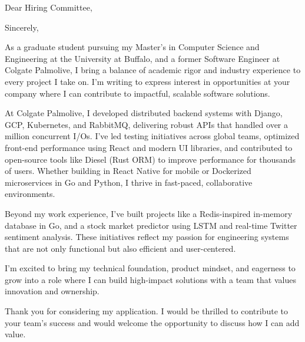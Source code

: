 \documentclass[11pt,a4paper,roman]{moderncv}
\begin{document}
\date{\today}
\opening{Dear Hiring Committee,}
\closing{Sincerely,}
\makelettertitle

As a graduate student pursuing my Master’s in Computer Science and Engineering 
at the University at Buffalo, and a former Software Engineer at Colgate Palmolive, 
I bring a balance of academic rigor and industry experience to every project I 
take on. I’m writing to express interest in opportunities at your company where I 
can contribute to impactful, scalable software solutions.

At Colgate Palmolive, I developed distributed backend systems with Django, GCP, 
Kubernetes, and RabbitMQ, delivering robust APIs that handled over a million 
concurrent I/Os. I’ve led testing initiatives across global teams, optimized 
front-end performance using React and modern UI libraries, and contributed to 
open-source tools like Diesel (Rust ORM) to improve performance for thousands of 
users. Whether building in React Native for mobile or Dockerized microservices 
in Go and Python, I thrive in fast-paced, collaborative environments.

Beyond my work experience, I’ve built projects like a Redis-inspired in-memory 
database in Go, and a stock market predictor using LSTM and real-time Twitter 
sentiment analysis. These initiatives reflect my passion for engineering systems 
that are not only functional but also efficient and user-centered.

I’m excited to bring my technical foundation, product mindset, and eagerness to 
grow into a role where I can build high-impact solutions with a team that 
values innovation and ownership.

Thank you for considering my application. I would be thrilled to contribute to 
your team’s success and would welcome the opportunity to discuss how I can 
add value.

\makeletterclosing
\end{document}
